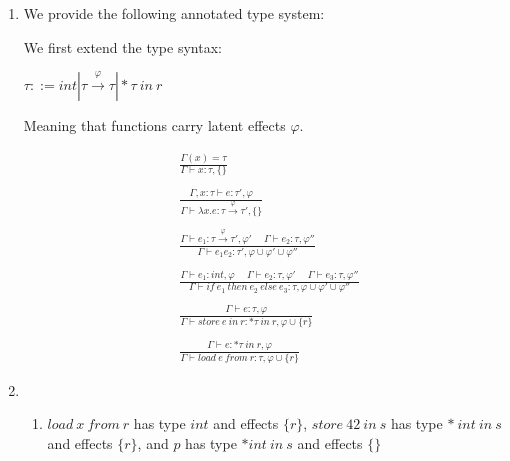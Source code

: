 


\begin{enumerate}[label=(\alph*)]
  \item

    We provide the following annotated type system:

    We first extend the type syntax:

    $\tau ::= int | \tau \xrightarrow{\varphi}\tau| *\tau\ in\ r$

    Meaning that functions carry latent effects $\varphi$.

    \begin{align*}
      &\frac{\Gamma(x) = \tau}{\Gamma \vdash x : \tau, \{\}}\\
      \\
      &\frac{\Gamma, x : \tau \vdash e : \tau', \varphi}{\Gamma \vdash \lambda x. e : \tau \xrightarrow{\varphi} \tau', \{\}}\\
      \\
      &\frac{\Gamma \vdash e_1 : \tau \xrightarrow{\varphi} \tau', \varphi' \hspace{15pt} \Gamma \vdash e_2 : \tau, \varphi''}{\Gamma \vdash e_1 e_2 : \tau', \varphi \cup \varphi' \cup \varphi''}\\
      \\
      &\frac{\Gamma \vdash e_1 : int, \varphi \hspace{15pt} \Gamma \vdash e_2 : \tau, \varphi' \hspace{15pt} \Gamma \vdash e_3 : \tau, \varphi''}{\Gamma \vdash if\ e_1\ then\ e_2\ else\ e_3 : \tau, \varphi \cup \varphi' \cup \varphi''}\\
      \\
      &\frac{\Gamma \vdash e : \tau, \varphi}{\Gamma \vdash store\ e\ in\ r : *\tau\ in\ r, \varphi \cup \{r\}}\\
      \\
      &\frac{\Gamma \vdash e : *\tau\ in\ r, \varphi}{\Gamma \vdash load\ e\ from\ r : \tau, \varphi \cup \{r\}}
    \end{align*}

  \item
    \begin{enumerate}[label=(\roman*)]

      \item

        $load\ x\ from\ r$ has type $int$ and effects $\{r\}$, $store\ 42\ in\ s$ has type $*\ int\ in\ s$ and effects $\{r\}$, and $p$ has type $*int\ in\ s$ and effects $\{\}$


\end{enumerate}
\end{enumerate}
